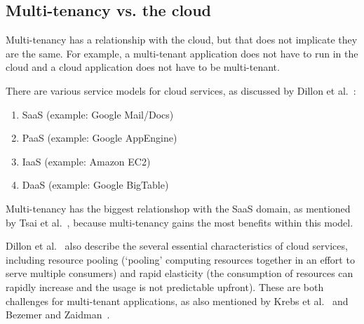 \subsection{Multi-tenancy vs. the cloud}

Multi-tenancy has a relationship with the cloud, but that does not implicate they are the same. For example, a multi-tenant application does not have to run in the cloud and a cloud application does not have to be multi-tenant.

There are various service models for cloud services, as discussed by Dillon et al.~\cite{dillon2010cloud}:
\begin{enumerate}
\item \acf{SaaS} (example: Google Mail/Docs)
\item \acf{PaaS} (example: Google AppEngine)
\item \acf{IaaS} (example: Amazon EC2)
\item \acf{DaaS} (example: Google BigTable)
\end{enumerate}

Multi-tenancy has the biggest relationshop with the \ac{SaaS} domain, as mentioned by Tsai et al.~\cite{tsai2010towards}, because multi-tenancy gains the most benefits within this model.

Dillon et al.~\cite{dillon2010cloud} also describe the several essential characteristics of cloud services, including resource pooling (`pooling' computing resources together in an effort to serve multiple consumers) and rapid elasticity (the consumption of resources can rapidly increase and the usage is not predictable upfront). These are both challenges for multi-tenant applications, as also mentioned by Krebs et al.~\cite{krebs2012architecture} and Bezemer and Zaidman~\cite{bezemer2010multi}.
